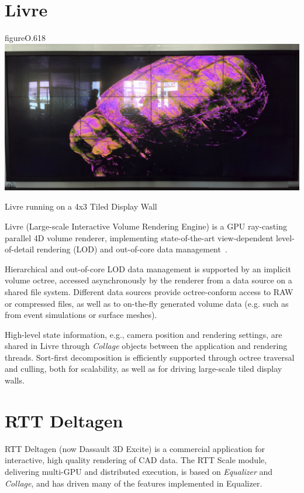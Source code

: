 \section{Livre}

\begin{wrapfloat}{figure}{O}{.618\textwidth}
  \includegraphics[width=.618\textwidth]{images/livre}
  {\caption{\label{fLivre}Livre running on a 4x3 Tiled Display Wall}}
\end{wrapfloat}

Livre (Large-scale Interactive Volume Rendering Engine) is a GPU ray-casting
parallel 4D volume renderer, implementing state-of-the-art view-dependent
level-of-detail rendering (LOD) and out-of-core data
management~\cite{EHKRW:06}.

Hierarchical and out-of-core LOD data management is supported by an implicit
volume octree, accessed asynchronously by the renderer from a data source on a
shared file system. Different data sources provide octree-conform access to
RAW or compressed files, as well as to on-the-fly generated volume data (e.g.
such as from event simulations or surface meshes).

High-level state information, e.g., camera position and rendering settings, are
shared in Livre through {\em Collage} objects between the application and
rendering threads. Sort-first decomposition is efficiently supported through
octree traversal and culling, both for scalability, as well as for driving
large-scale tiled display walls.

\section{RTT Deltagen}

RTT Deltagen (now Dassault 3D Excite) is a commercial application for
interactive, high quality rendering of CAD data. The RTT Scale module,
delivering multi-GPU and distributed execution, is based on {\em Equalizer}
and {\em Collage}, and has driven many of the features implemented in
Equalizer.

